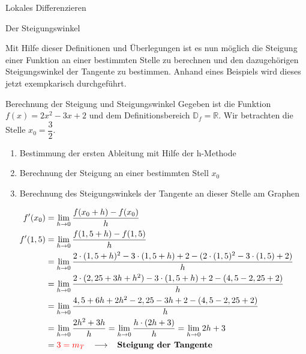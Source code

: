 \begin{section}{Lokales Differenzieren}
\begin{bem*}{Der Steigungswinkel}{}
\begin{center}
\end{center}
\end{bem*}
Mit Hilfe dieser Definitionen und Überlegungen ist es nun möglich die Steigung einer Funktion an einer bestimmten Stelle zu berechnen und den dazugehörigen Steigungswinkel der Tangente zu bestimmen. Anhand eines Beispiels wird dieses jetzt exempkarisch durchgeführt.
\begin{bsp*}{Berechnung der Steigung und Steigungswinkel}{}
Gegeben ist die Funktion $f(x)= 2x^2 - 3x +2 $ und dem Definitionsbereich $\mathds{D}_f = \mathds{R}$. Wir betrachten die Stelle $x_0 = \dfrac{3}{2}$.
\begin{enumerate}
    \item Bestimmung der ersten Ableitung mit Hilfe der h-Methode
    \item Berechnung der Steigung an einer bestimmten Stell $x_0$
    \item Berechnung des Steigungswinkels der Tangente an dieser Stelle am Graphen
\end{enumerate}
\begin{equation*}
\begin{split}
f'(x_0) &= \lim_{h\rightarrow 0} \dfrac{f(x_0+h)-f(x_0)}{h}\\ f'(1,5)&=\lim_{h\rightarrow 0} \dfrac{f(1,5 +h) - f(1,5)}{h}\\ &= \lim_{h\rightarrow 0} \dfrac{2\cdot (1,5 +h)^2 -3\cdot(1,5+h) + 2-(2\cdot (1,5)^2 - 3\cdot (1,5) + 2)}{h}\\
&= \lim_{h\rightarrow 0} \dfrac{2\cdot (2,25 +3h + h^2) -3\cdot(1,5+h) + 2 - (4,5 -2,25 +2)}{h}\\
&= \lim_{h\rightarrow 0} \dfrac{4,5+6h+2h^2-2,25-3h+2-(4,5 -2,25 +2)}{h}\\
&= \lim_{h\rightarrow 0} \dfrac{2h^2+3h}{h}= \lim_{h\rightarrow 0} \dfrac{h\cdot( 2h+3)}{h} = \lim_{h\rightarrow 0} 2h+3\\
&= \textcolor{red}{3 = m_T} \hspace{0.3cm} \longrightarrow \hspace{0.3cm} \textbf{Steigung der Tangente}
\end{split}
\end{equation*}

\end{bsp*}
\end{section}
